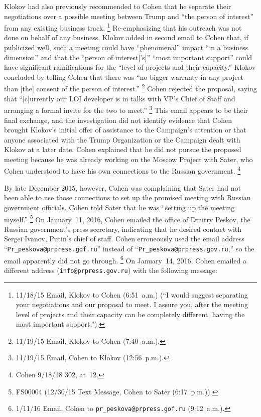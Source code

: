 Klokov had also previously recommended to Cohen that he separate their negotiations over a possible meeting between Trump and ``the person of interest'' from any existing business track.%
\footnote{11/18/15 Email, Klokov to Cohen (6:51~a.m.) (``I would suggest separating your negotiations and our proposal to meet.
I assure you, after the meeting level of projects and their capacity can be completely different, having the most important support.'').}
Re-emphasizing that his outreach was not done on behalf of any business, Klokov added in second email to Cohen that, if publicized well, such a meeting could have ``phenomenal'' impact ``in a business dimension'' and that the ``person of interest['s]'' ``most important support'' could have significant ramifications for the ``level of projects and their capacity.''
Klokov concluded by telling Cohen that there was ``no bigger warranty in any project than [the] consent of the person of interest.''%
\footnote{11/19/15 Email, Klokov to Cohen (7:40~a.m.).}
Cohen rejected the proposal, saying that ``[c]urrently our LOI developer is in talks with VP's Chief of Staff and arranging a formal invite for the two to meet.''%
\footnote{11/19/15 Email, Cohen to Klokov (12:56~p.m.).}
This email appears to be their final exchange, and the investigation did not identify evidence that Cohen brought Klokov's initial offer of assistance to the Campaign's attention or that anyone associated with the Trump Organization or the Campaign dealt with Klokov at a later date.
Cohen explained that he did not pursue the proposed meeting because he was already working on the Moscow Project with Sater, who Cohen understood to have his own connections to the Russian government.%
\footnote{Cohen 9/18/18 302, at~12.}

By late December 2015, however, Cohen was complaining that Sater had not been able to use those connections to set up the promised meeting with Russian government officials.
Cohen told Sater that he was ``setting up the meeting myself.''%
\footnote{FS00004 (12/30/15 Text Message, Cohen to Sater (6:17~p.m.)).}
On January~11, 2016, Cohen emailed the office of Dmitry Peskov, the Russian government's press secretary, indicating that he desired contact with Sergei Ivanov, Putin's chief of staff.
Cohen erroneously used the email address ``\verb+Pr_peskova@prpress.gof.ru+'' instead of ``\verb+Pr_peskova@prpress.gov.ru+,'' so the email apparently did not go through.%
\footnote{1/11/16 Email, Cohen to \verb+pr_peskova@prpress.gof.ru+ (9:12~a.m.).}
On January~14, 2016, Cohen emailed a different address (\verb+info@prpress.gov.ru+) with the following message:

